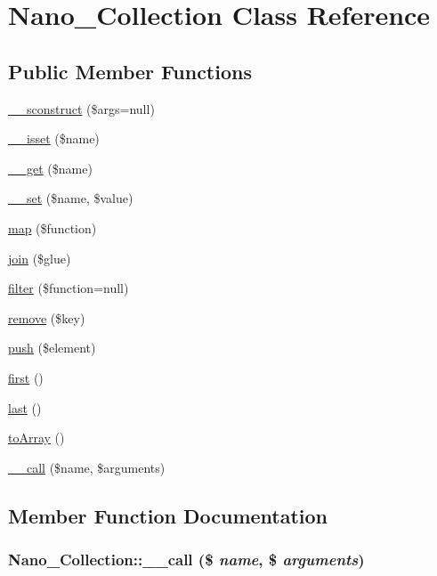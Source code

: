 \hypertarget{classNano__Collection}{
\section{Nano\_\-Collection Class Reference}
\label{classNano__Collection}
}
\subsection*{Public Member Functions}
\begin{CompactItemize}
\item 
\hyperlink{classNano__Collection_6ce190c316defd206707b186e312bbac}{\_\-\_\-sconstruct} (\$args=null)
\item 
\hyperlink{classNano__Collection_2efb27f0b6f87bd66c33d63988191578}{\_\-\_\-isset} (\$name)
\item 
\hyperlink{classNano__Collection_0fed66ab270585399fffb03d9421b05c}{\_\-\_\-get} (\$name)
\item 
\hyperlink{classNano__Collection_4e51af85e79344c64f93457ba8676d18}{\_\-\_\-set} (\$name, \$value)
\item 
\hyperlink{classNano__Collection_d0d19933a358135d5c2b4e9f02287776}{map} (\$function)
\item 
\hyperlink{classNano__Collection_8c148b39d849f949ab1607b6a5635124}{join} (\$glue)
\item 
\hyperlink{classNano__Collection_42a5cd30db833d7212dff48599e65e10}{filter} (\$function=null)
\item 
\hyperlink{classNano__Collection_258e46af26d02f5c1a6f7273471bb86c}{remove} (\$key)
\item 
\hyperlink{classNano__Collection_1d77c642aac8c7d58893379c70bd9cfb}{push} (\$element)
\item 
\hyperlink{classNano__Collection_2ed528001470def798cfb38168e77b75}{first} ()
\item 
\hyperlink{classNano__Collection_ddfd65eabf7563daf2f27be23d38cb07}{last} ()
\item 
\hyperlink{classNano__Collection_f45474db23d4d5b0b122ab233e3cc725}{toArray} ()
\item 
\hyperlink{classNano__Collection_592401d11ce0c63a3e8ed74545bf6917}{\_\-\_\-call} (\$name, \$arguments)
\end{CompactItemize}


\subsection{Member Function Documentation}
\hypertarget{classNano__Collection_592401d11ce0c63a3e8ed74545bf6917}{
\subsubsection[{\_\-\_\-call}]{\setlength{\rightskip}{0pt plus 5cm}Nano\_\-Collection::\_\-\_\-call (\$ {\em name}, \/  \$ {\em arguments})}}
\label{classNano__Collection_592401d11ce0c63a3e8ed74545bf6917}


